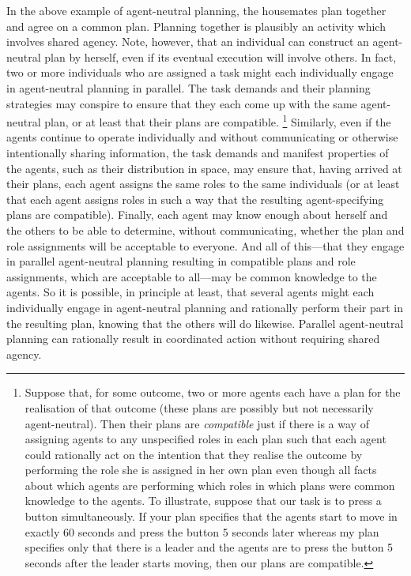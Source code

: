 \documentclass[12pt,\papersize]{extarticle}
\begin{document}
In the above example of agent-neutral planning,
	the housemates plan together and agree on a common plan.
	Planning together is plausibly an activity which involves shared agency.
	Note, however, that an individual can construct an agent-neutral plan by herself, even if its eventual execution will involve others.
	In fact, two or more individuals who are assigned a task might each individually engage in agent-neutral planning in parallel.
	The task demands and their planning strategies may conspire to ensure that they each come up with the same agent-neutral plan, or at least that their plans are compatible.%
\footnote{
Suppose that, for some outcome, two or more agents each have a plan for the realisation of that outcome (these plans are possibly but not necessarily agent-neutral).
Then their plans are \emph{compatible} just if 
	there is a way of assigning agents to any unspecified roles in each plan such that  each agent could rationally act on the intention that they realise the outcome by 	performing the role she is assigned in her own plan even though all facts about which agents are performing which roles in which plans were common knowledge to the agents.
To illustrate, suppose that our task is to press a button simultaneously. 
If your plan specifies that the agents start to move in exactly 60 seconds and press the button 5 seconds later whereas my plan specifies only that there is a leader and the agents are to press the button 5 seconds after the  leader starts moving, then our plans are compatible.
}
%
Similarly, even if the agents continue to operate individually and without communicating or otherwise intentionally sharing information, the task demands and manifest properties of the agents, such as their distribution in space, may ensure that, having arrived at their plans, each agent assigns the same roles to the same individuals (or at least that each agent assigns roles in such a way that the resulting agent-specifying plans are compatible).
%
Finally, each agent may know enough about herself and the others to be able to determine, without communicating, whether the plan and role assignments will be acceptable to everyone. 
	And all of this---that they engage in parallel agent-neutral planning resulting in compatible plans and role assignments, which are acceptable to all---may be common knowledge to the agents.
	So it is possible, in principle at least, 
	that several agents might each individually engage in agent-neutral planning and rationally perform their part in the resulting plan, knowing that the others will do likewise.
	Parallel agent-neutral planning can rationally result in coordinated action without requiring shared agency.
\end{document}
